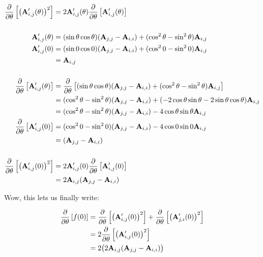 \documentclass[11pt, oneside]{amsart}
\begin{document}
\begin{equation*}
  \begin{split}
    \frac{\partial }{\partial \theta} \left[ \left( \mathbf{A}'_{i, j}(\theta) \right)^2 \right]
      ={}&
        2
        \mathbf{A}'_{i, j}(\theta)
        \frac{\partial }{\partial \theta} \left[ \mathbf{A}'_{i, j}(\theta) \right] \\
    \\
    \mathbf{A}'_{i, j}(\theta)
      ={}&
        (\sin\theta\cos\theta) (\mathbf{A}_{j, j} - \mathbf{A}_{i, i})
        + (\cos^2\theta - \sin^2\theta) \mathbf{A}_{i, j} \\
    \mathbf{A}'_{i, j}(0)
      ={}&
        (\sin0 \cos0) (\mathbf{A}_{j, j} - \mathbf{A}_{i, i})
        + (\cos^2 0 - \sin^2 0) \mathbf{A}_{i, j} \\
      ={}& \mathbf{A}_{i, j} \\
    \\
    \frac{\partial }{\partial \theta} \left[ \mathbf{A}'_{i, j}(\theta) \right]
      ={}&
        \frac{\partial }{\partial \theta} \left[
          (\sin\theta\cos\theta)(\mathbf{A}_{j, j} - \mathbf{A}_{i, i})
          + (\cos^2\theta - \sin^2\theta) \mathbf{A}_{i, j}
        \right] \\
      ={}&
        (\cos^2\theta - \sin^2\theta) (\mathbf{A}_{j, j} - \mathbf{A}_{i, i})
        + (-2\cos\theta\sin\theta - 2\sin\theta\cos\theta) \mathbf{A}_{i, j} \\
      ={}&
        (\cos^2\theta - \sin^2\theta) (\mathbf{A}_{j, j} - \mathbf{A}_{i, i})
        - 4 \cos\theta\sin\theta \mathbf{A}_{i, j} \\
    \frac{\partial }{\partial \theta} \left[ \mathbf{A}'_{i, j}(0) \right]
      ={}&
        (\cos^2 0 - \sin^2 0) (\mathbf{A}_{j, j} - \mathbf{A}_{i, i})
        - 4 \cos 0 \sin 0 \mathbf{A}_{i, j} \\
      ={}&
        (\mathbf{A}_{j, j} - \mathbf{A}_{i, i}) \\
    \\
    \frac{\partial }{\partial \theta} \left[ \left( \mathbf{A}'_{i, j}(0) \right)^2 \right]
      ={}&
        2
        \mathbf{A}'_{i, j}(0)
        \frac{\partial }{\partial \theta} \left[ \mathbf{A}'_{i, j}(0) \right] \\
      ={}&
        2
        \mathbf{A}_{i, j}
        (\mathbf{A}_{j, j} - \mathbf{A}_{i, i}) \\
  \end{split}
\end{equation*}

Wow, this lets us finally write:

\begin{equation*}
  \begin{split}
    \frac{\partial }{\partial \theta} \left[ f(0) \right]
      ={}&
        \frac{\partial }{\partial \theta} \left[ \left( \mathbf{A}'_{i, j}(0) \right)^2 \right]
        + \frac{\partial }{\partial \theta} \left[ \left( \mathbf{A}'_{j, i}(0) \right)^2 \right] \\
      ={}&
        2 \frac{\partial }{\partial \theta} \left[ \left( \mathbf{A}'_{i, j}(0) \right)^2 \right] \\
      ={}&
        2 \big( 2 \mathbf{A}_{i, j} (\mathbf{A}_{j, j} - \mathbf{A}_{i, i}) \big) \\
  \end{split}
\end{equation*}
\end{document}
